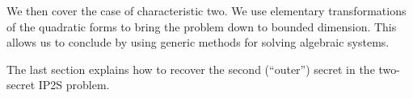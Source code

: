 \documentclass{lms}
\begin{document}
We then cover the case of characteristic two.
We use elementary transformations of the quadratic forms
to bring the problem down to bounded dimension.
This allows us to conclude by using generic methods
for solving algebraic systems.

% 
% 
% 
% 
% 
% 

The last section explains how to recover the second (``outer'') secret
in the two-secret IP2S problem.
\end{document}
